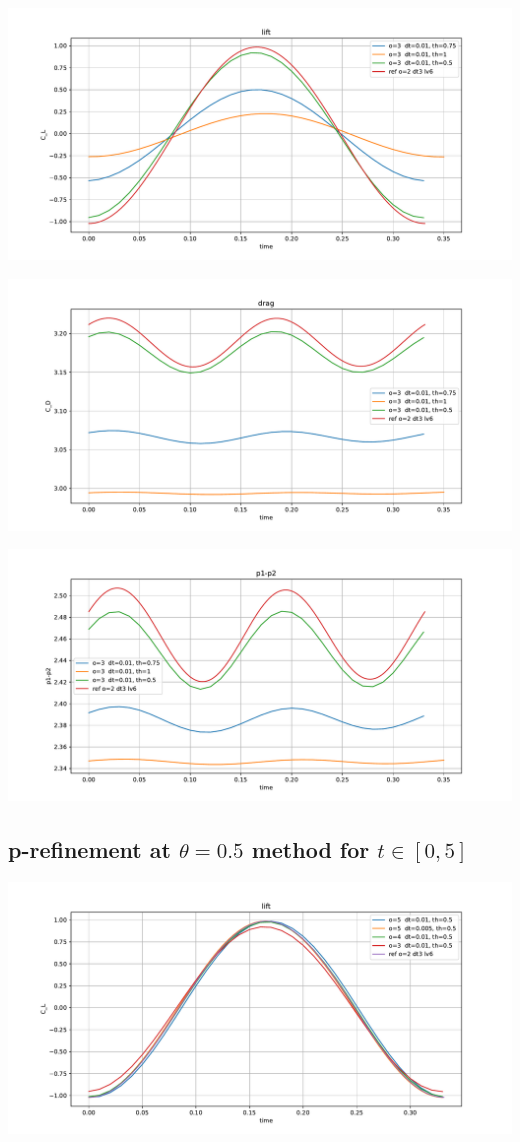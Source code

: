 \documentclass[11pt]{article}
\begin{document}
\includegraphics[width=0.75\columnwidth]{lift_full_implicit_per}

\includegraphics[width=0.75\columnwidth]{drag_full_implicit_per}

\includegraphics[width=0.75\columnwidth]{p1p2_full_implicit_per}


\subsection{p-refinement at $\theta= 0.5$ method for $t\in[0,5]$}

\includegraphics[width=0.75\columnwidth]{lift_final}
\end{document}

